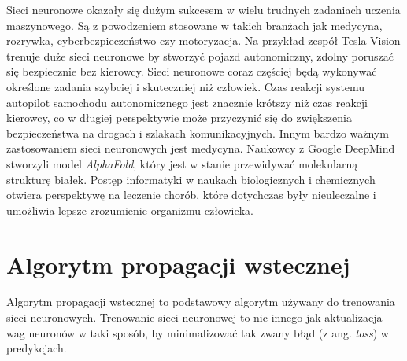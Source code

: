 Sieci neuronowe okazały się dużym sukcesem w wielu trudnych zadaniach uczenia maszynowego.
Są z powodzeniem stosowane w takich branżach jak medycyna, rozrywka, cyberbezpieczeństwo czy motoryzacja. Na przykład zespół Tesla Vision trenuje duże sieci neuronowe by stworzyć pojazd autonomiczny, zdolny poruszać się bezpiecznie bez kierowcy.
Sieci neuronowe coraz częściej będą wykonywać określone zadania szybciej i skuteczniej niż człowiek.
Czas reakcji systemu autopilot samochodu autonomicznego jest znacznie krótszy niż czas reakcji kierowcy, co w długiej perspektywie może przyczynić się do zwiększenia bezpieczeństwa na drogach i szlakach komunikacyjnych.
Innym bardzo ważnym zastosowaniem sieci neuronowych jest medycyna. Naukowcy z Google DeepMind stworzyli model \textit{AlphaFold}, który jest w stanie przewidywać molekularną strukturę białek.
Postęp informatyki w naukach biologicznych i chemicznych otwiera perspektywę na leczenie chorób, które dotychczas były nieuleczalne i umożliwia lepsze zrozumienie organizmu człowieka.


\section{Algorytm propagacji wstecznej}

Algorytm propagacji wstecznej to podstawowy algorytm używany do trenowania sieci neuronowych.
Trenowanie sieci neuronowej to nic innego jak aktualizacja wag neuronów w taki sposób, by minimalizować tak zwany błąd (z ang. \textit{loss}) w predykcjach.

